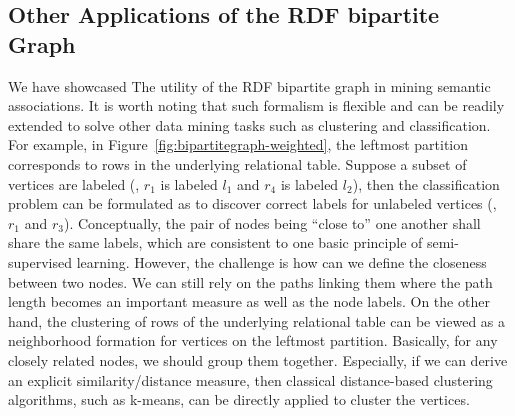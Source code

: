 \subsection{Other Applications of the RDF bipartite Graph}
We have showcased The utility of the RDF bipartite graph in mining semantic associations. It is worth noting that such formalism is flexible and can be readily extended to solve other data mining tasks such as clustering and classification. For example, in Figure~\ref{fig:bipartitegraph-weighted}, the leftmost partition corresponds to rows in the underlying relational table. Suppose a subset of vertices are labeled (\eg, $r_1$ is labeled $l_1$ and $r_4$ is labeled $l_2$), then the classification problem can be formulated as to discover correct labels for unlabeled vertices (\eg, $r_1$ and $r_3$). Conceptually, the pair of nodes being ``close to'' one another shall share the same labels, which are consistent to one basic principle of  semi-supervised learning. However, the challenge is how can we define the closeness between two nodes. We can still rely on the paths linking them where the path length becomes an important measure as well as the node labels. On the other hand, the clustering of rows of the underlying relational table can be viewed as a neighborhood formation for vertices on the leftmost partition. Basically, for any closely related nodes, we should group them together. Especially, if we can derive an explicit  similarity/distance measure, then classical distance-based clustering algorithms, such as k-means, can be directly applied to cluster the vertices.
